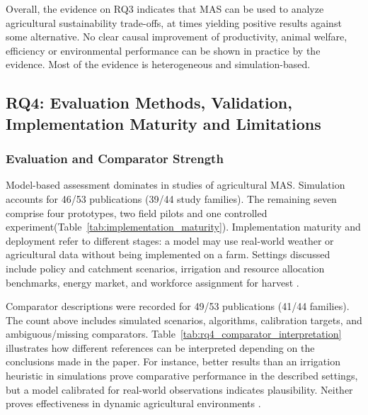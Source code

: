 \documentclass[11pt,a4paper]{article}
\begin{document}
Overall, the evidence on RQ3 indicates that MAS can be used to
analyze agricultural sustainability trade-offs, at times yielding
positive results against some alternative. No clear causal improvement of productivity, animal welfare, efficiency or environmental performance can be shown in practice by the evidence. Most of the evidence is heterogeneous and simulation-based.




\subsection{RQ4: Evaluation Methods, Validation, Implementation Maturity and Limitations}

\subsubsection{Evaluation and Comparator Strength}

Model-based assessment dominates in studies of agricultural MAS.
Simulation accounts for 46/53 publications (39/44 study families). The remaining seven comprise four prototypes, two field pilots and one controlled experiment(Table~\ref{tab:implementation_maturity}). Implementation maturity
and deployment refer to different stages: a model may use real-world
weather or agricultural data without being implemented on a farm.
Settings discussed include policy and catchment scenarios,
irrigation and resource allocation benchmarks, energy market, and
workforce assignment for harvest \parencite{cobbenhagen_optimal_2022,
quang_ex-ante_2014,harman_multi-agent_2022}.

Comparator descriptions were recorded for 49/53 publications
(41/44 families). The count above includes simulated scenarios,
algorithms, calibration targets, and ambiguous/missing comparators.
Table~\ref{tab:rq4_comparator_interpretation}
illustrates how different references can be interpreted depending
on the conclusions made in the paper. For instance, better results
than an irrigation heuristic in simulations prove comparative
performance in the described settings, but a model calibrated for
real-world observations indicates plausibility. Neither proves
effectiveness in dynamic agricultural environments
\parencite{schoonen_optimal_2019,harman_challenges_2023}.
\end{document}
